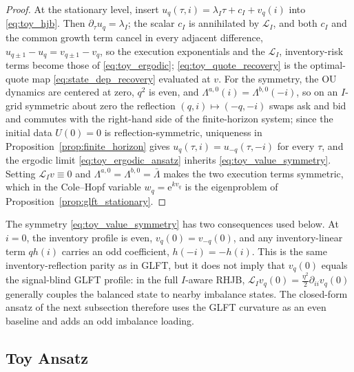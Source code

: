 \documentclass[11pt,a4paper]{article}
\newcommand{\Lcal}{\mathcal{L}}
\newcommand{\e}{\mathrm e}
\theoremstyle{plain}
\theoremstyle{definition}
\begin{document}
\begin{proof}
At the stationary level, insert
\(u_q(\tau,i)=\lambda_I\tau+c_I+v_q(i)\) into \eqref{eq:toy_hjb}.  Then
\(\partial_\tau u_q=\lambda_I\); the scalar \(c_I\) is annihilated by
\(\Lcal_I\), and both \(c_I\) and the common growth term cancel in every
adjacent difference, \(u_{q\pm1}-u_q=v_{q\pm1}-v_q\), so the execution
exponentials and the \(\Lcal_I\), inventory-risk terms become those of
\eqref{eq:toy_ergodic}; \eqref{eq:toy_quote_recovery} is the optimal-quote map
\eqref{eq:state_dep_recovery} evaluated at \(v\).  For the symmetry, the OU
dynamics are centered at zero, \(q^2\) is even, and
\(\Lambda^{a,0}(i)=\Lambda^{b,0}(-i)\), so on an \(I\)-grid symmetric about
zero the reflection \((q,i)\mapsto(-q,-i)\) swaps ask and bid and commutes
with the right-hand side of the finite-horizon system; since the initial data
\(U(0)=0\) is reflection-symmetric, uniqueness in
Proposition~\ref{prop:finite_horizon} gives \(u_q(\tau,i)=u_{-q}(\tau,-i)\)
for every \(\tau\), and the ergodic limit \eqref{eq:toy_ergodic_ansatz}
inherits \eqref{eq:toy_value_symmetry}.  Setting \(\Lcal_I v\equiv0\) and
\(\Lambda^{a,0}=\Lambda^{b,0}=\bar\Lambda\) makes the two execution terms
symmetric, which in the Cole--Hopf variable \(w_q=\e^{kv_q}\) is the eigenproblem
of Proposition~\ref{prop:glft_stationary}.
\end{proof}

The symmetry \eqref{eq:toy_value_symmetry} has two consequences used below.  At
\(i=0\), the inventory profile is even, \(v_q(0)=v_{-q}(0)\), and any
inventory-linear term \(qh(i)\) carries an odd coefficient,
\(h(-i)=-h(i)\).  This is the same inventory-reflection parity as in GLFT, but
it does not imply that \(v_q(0)\) equals the signal-blind GLFT profile: in the
full \(I\)-aware RHJB,
\(\Lcal_Iv_q(0)=\tfrac{\eta^2}{2}\partial_{ii}v_q(0)\) generally couples the
balanced state to nearby imbalance states.  The closed-form ansatz of the next
subsection therefore uses the GLFT curvature as an even baseline and adds an
odd imbalance loading.

\subsection{Toy Ansatz}
\label{subsec:toy_curvature}
\end{document}
